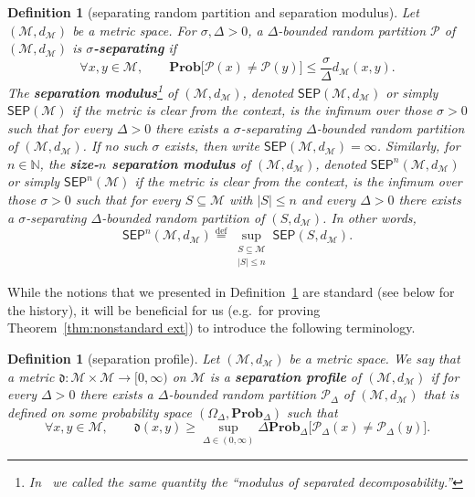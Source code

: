\documentclass[11pt,reqno]{amsart}
\renewcommand{\le}{\leqslant}
\renewcommand{\ge}{\geqslant}
\newtheorem{definition}[theorem]{Definition}
\theoremstyle{remark}
\newcommand{\MM}{\mathcal{M}}
\renewcommand{\subset}{\subseteq}
\newcommand{\N}{\mathbb N}
\newcommand{\eqdef}{\stackrel{\mathrm{def}}{=}}
\renewcommand{\Pr}{\mathbf{Prob}}
\renewcommand{\1}{\mathbf 1}
\newcommand{\Part}{\mathscr{P}}
\newcommand{\us}{\sigma}
\newcommand{\sep}{\mathsf{SEP}}
\begin{document}
\begin{definition}[separating random partition and separation modulus]\label{def:separating finite} Let $(\MM,d_\MM)$ be a  metric space. For $\us,\Delta>0$, a $\Delta$-bounded random  partition $\Part$ of $(\MM,d_\MM)$ is {\bf \em $\us$-separating} if
\begin{equation}\label{eq:separating condition}
\forall  x,y\in \MM,\qquad \Pr\big[\Part(x)\neq \Part(y)\big]\le \frac{\us}{\Delta}d_\MM(x,y).
\end{equation}
The {\bf \em separation modulus}\footnote{In~\cite{Nao17-SODA} we called the same quantity the ``modulus of separated decomposability.''} of $(\MM,d_\MM)$, denoted $\sep(\MM,d_\MM)$ or simply $\sep(\MM)$ if the metric is clear from the context, is the infimum over those $\sigma >0$ such that for every $\Delta>0$ there exists  a $\sigma$-separating  $\Delta$-bounded  random partition of $(\MM,d_\MM)$. If no such $\sigma$ exists, then write $\sep(\MM,d_\MM)=\infty$. Similarly, for $n\in \N$, the {\bf \em size-$n$ separation modulus} of $(\MM,d_\MM)$, denoted $\sep^n(\MM,d_\MM)$ or simply $\sep^n(\MM)$ if the metric is clear from the context, is the infimum over those $\us>0$ such that for every $S\subset \MM$ with $|S|\le n$ and every $\Delta>0$ there exists a $\us$-separating $\Delta$-bounded  random partition of $(S,d_\MM)$. In other words,
$$
\sep^n(\MM,d_\MM)\eqdef \sup_{\substack{S\subset \MM\\ |S|\le n}}\sep(S,d_\MM).
$$
\end{definition}

While the notions that we presented in Definition~\ref{def:separating finite} are standard (see below for the history), it will be beneficial for us (e.g.~for proving Theorem~\ref{thm:nonstandard ext}) to introduce the following terminology.


\begin{definition}[separation profile]\label{def:separation profile} Let $(\MM,d_\MM)$ be a  metric space. We say that a metric $\mathfrak{d}:\MM\times \MM\to [0,\infty)$ on $\MM$ is   a {\bf \em separation profile} of $(\MM,d_\MM)$ if for every $\Delta>0$ there exists a $\Delta$-bounded random partition $\Part_\Delta$ of $(\MM,d_\MM)$ that is defined on some probability space $(\Omega_\Delta,\Pr_\Delta)$ such that
\begin{equation}\label{eq:def separation profile}
\forall x,y\in \MM,\qquad \mathfrak{d}(x,y)\ge \sup_{\Delta\in (0,\infty)} \Delta\Pr_\Delta\big[\Part_\Delta(x)\neq \Part_\Delta(y)\big].
\end{equation}
\end{definition}
\end{document}

